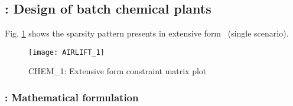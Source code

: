 \subsection{\chem: Design of batch chemical plants} \label{CHEM}


Fig. \ref{fig:chem_sparsity} shows the sparsity pattern presents in extensive form \chem\ (single scenario).
\begin{figure}[H]
	\centering
	\texttt{[image: AIRLIFT\_1]}
	\caption{CHEM\_1: Extensive form constraint matrix plot}
	\label{fig:chem_sparsity}
\end{figure}

\subsubsection{\chem: Mathematical formulation}

